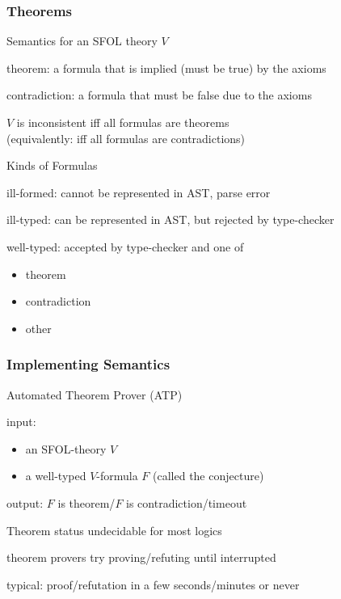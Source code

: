 \begin{frame}\frametitle{Theorems}
\begin{blockitems}{Semantics for an SFOL theory $V$}
\item theorem: a formula that is implied (must be true) by the axioms
\item contradiction: a formula that must be false due to the axioms
\item $V$ is inconsistent iff all formulas are theorems \\ (equivalently: iff all formulas are contradictions)
\end{blockitems}

\begin{blockitems}{Kinds of Formulas}
\item ill-formed: cannot be represented in AST, parse error
\item ill-typed: can be represented in AST, but rejected by type-checker
\item well-typed: accepted by type-checker and one of
\begin{itemize}
\item theorem
\item contradiction
\item other
\end{itemize}
\end{blockitems}
\end{frame}


\begin{frame}\frametitle{Implementing Semantics}
\begin{blockitems}{Automated Theorem Prover (ATP)}
\item input:
 \begin{itemize}
 \item an SFOL-theory $V$
 \item a well-typed $V$-formula $F$ (called the conjecture)
 \end{itemize}
\item output: $F$ is theorem/$F$ is contradiction/timeout
\end{blockitems}

\begin{blockitems}{Theorem status undecidable for most logics}
\item theorem provers try proving/refuting until interrupted
\item typical: proof/refutation in a few seconds/minutes or never
\end{blockitems}

\end{frame}


